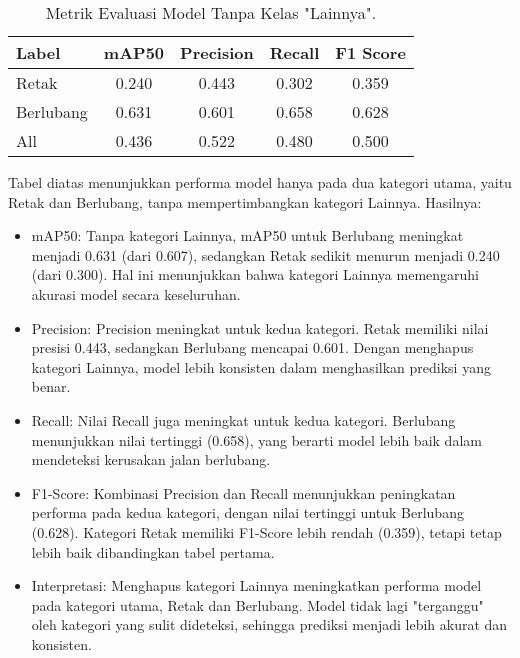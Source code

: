 \documentclass[12pt,a4paper]{article}
\begin{document}
\begin{table}[ht]
\centering
\begin{tabularx}{0.7\textwidth}{lCCCC}
    \toprule
    \textbf{Label} & \textbf{mAP50} & \textbf{Precision} & \textbf{Recall} & \textbf{F1 Score} \\
    \midrule
    Retak & 0.240 & 0.443 & 0.302 & 0.359 \\
    Berlubang & 0.631 & 0.601 & 0.658 & 0.628 \\
    All & 0.436 & 0.522 & 0.480 & 0.500 \\
    \bottomrule
\end{tabularx}
\caption{Metrik Evaluasi Model Tanpa Kelas "Lainnya".}
\label{tab:without_others}
\end{table}

\begin{adjustwidth}{3em}{0pt}
Tabel diatas menunjukkan performa model hanya pada dua kategori utama, yaitu Retak dan Berlubang, tanpa mempertimbangkan kategori Lainnya. Hasilnya:

\begin{itemize}
    \item mAP50: Tanpa kategori Lainnya, mAP50 untuk Berlubang meningkat menjadi 0.631 (dari 0.607), sedangkan Retak sedikit menurun menjadi 0.240 (dari 0.300). Hal ini menunjukkan bahwa kategori Lainnya memengaruhi akurasi model secara keseluruhan.
    
    \item Precision: Precision meningkat untuk kedua kategori. Retak memiliki nilai presisi 0.443, sedangkan Berlubang mencapai 0.601. Dengan menghapus kategori Lainnya, model lebih konsisten dalam menghasilkan prediksi yang benar.
    
    \item Recall: Nilai Recall juga meningkat untuk kedua kategori. Berlubang menunjukkan nilai tertinggi (0.658), yang berarti model lebih baik dalam mendeteksi kerusakan jalan berlubang.
    
    \item F1-Score: Kombinasi Precision dan Recall menunjukkan peningkatan performa pada kedua kategori, dengan nilai tertinggi untuk Berlubang (0.628). Kategori Retak memiliki F1-Score lebih rendah (0.359), tetapi tetap lebih baik dibandingkan tabel pertama.
    
    \item Interpretasi: Menghapus kategori Lainnya meningkatkan performa model pada kategori utama, Retak dan Berlubang. Model tidak lagi "terganggu" oleh kategori yang sulit dideteksi, sehingga prediksi menjadi lebih akurat dan konsisten. 
\end{itemize}
\end{adjustwidth}
\end{document}
